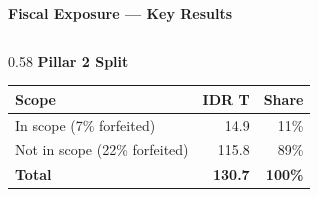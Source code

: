 \documentclass[aspectratio=169,10pt]{beamer}
\begin{document}
\begin{frame}{\textbf{Fiscal Exposure — Key Results}}
\begin{columns}[T]
\begin{column}{0.58\textwidth}
    {\footnotesize\textbf{Pillar 2 Split}}\\[4pt]
    \begin{tabular}{lrr}
      \toprule
      \rowcolor{navyblue}\color{white}\textbf{Scope} & \color{white}\textbf{IDR T} & \color{white}\textbf{Share}\\
      \midrule
      \rowcolor{lightgray} In scope (7\% forfeited) & 14.9 & 11\%\\
      Not in scope (22\% forfeited) & 115.8 & 89\%\\
      \midrule
      \rowcolor{navyblue}\color{white}\textbf{Total} & \color{white}\textbf{130.7} & \color{white}\textbf{100\%}\\
      \bottomrule
    \end{tabular}
  \end{column}
\end{columns}
\end{frame}
\end{document}

